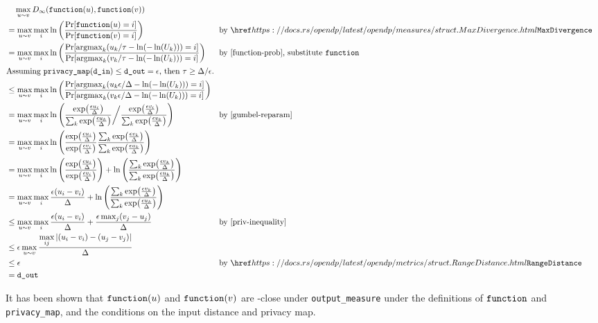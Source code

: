 \documentclass{article}
\begin{document}
\begin{align*}
    &\quad \max\limits_{u \sim v} D_\infty(\function(u), \function(v)) \\
    &= \max\limits_{u \sim v} \max\limits_{i} \ln\left(\frac{\Pr[\function(u) = i]}{\Pr[\function(v) = i]}\right) 
    &&\text{by } \rustdoc{measures/struct}{MaxDivergence}\\
    &= \max\limits_{u \sim v} \max\limits_{i} \ln\left(\frac
            {\Pr[\mathrm{argmax}_k (u_k / \tau - \ln(-\ln(U_k))) = i]}
            {\Pr[\mathrm{argmax}_k (v_k / \tau - \ln(-\ln(U_k))) = i]}
        \right) &&\text{by \ref{function-prob}, substitute \function}\\
    \intertext{Assuming $\texttt{privacy\_map}(\din) \le \dout = \epsilon$, then $ \tau \geq \Delta / \epsilon$.}
    &\le \max\limits_{u \sim v} \max\limits_{i} \ln\left(\frac
            {\Pr[\mathrm{argmax}_k (u_k \epsilon / \Delta - \ln(-\ln(U_k))) = i]}
            {\Pr[\mathrm{argmax}_k (v_k \epsilon / \Delta - \ln(-\ln(U_k))) = i]}
        \right)\\
    &= \max\limits_{u \sim v} \max\limits_{i} \ln \left(
        \frac
            {\exp(\frac{\epsilon u_i}{\Delta})}
            {\sum_{k} \exp(\frac{\epsilon u_k}{\Delta})
        }
        \bigg/ \frac
            {\exp(\frac{\epsilon v_i}{\Delta})}
            {\sum_{k} \exp(\frac{\epsilon v_k}{\Delta})} \right)
        &&\text{by \ref{gumbel-reparam}} \\
    &= \max\limits_{u \sim v} \max\limits_{i} \ln \left(\frac
        {\exp(\frac{\epsilon u_i}{\Delta})}{\exp(\frac{\epsilon v_i}{\Delta})}
        \frac{\sum_{k} \exp(\frac{\epsilon v_k}{\Delta})}{\sum_{k} \exp(\frac{\epsilon u_k}{\Delta})}\right) \\
    &= \max\limits_{u \sim v} \max\limits_{i} \ln \left(\frac
        {\exp(\frac{\epsilon u_i}{\Delta})}{\exp(\frac{\epsilon v_i}{\Delta})}\right) + \ln \left(
        \frac{\sum_{k} \exp(\frac{\epsilon v_k}{\Delta})}{\sum_{k} \exp(\frac{\epsilon u_k}{\Delta})}\right) \\
    &= \max\limits_{u \sim v} \max\limits_{i} \frac{\epsilon (u_i - v_i)}{\Delta} 
        + \ln\left(\frac{\sum_{k} \exp(\frac{\epsilon v_k}{\Delta})}{\sum_{k} \exp(\frac{\epsilon u_k}{\Delta})}\right) \\
    &\leq \max\limits_{u \sim v} \max\limits_{i} \frac{\epsilon (u_i - v_i)}{\Delta} + \frac{\epsilon \max_j (v_j - u_j)}{\Delta} &&\text{by \ref{priv-inequality}} \\
    &\leq \epsilon \max\limits_{u \sim v} \frac{\max\limits_{ij} \abs{(u_i - v_i) - (u_j - v_j)}}{\Delta} \\
    &\leq \epsilon &&\text{by }\rustdoc{metrics/struct}{RangeDistance} \\
    &= \dout
\end{align*}    

It has been shown that $\texttt{function}(u)$ and $\texttt{function}(v)$ are \dout-close under \texttt{output\_measure} 
under the definitions of $\texttt{function}$ and \texttt{privacy\_map}, 
and the conditions on the input distance and privacy map.





\end{document}
